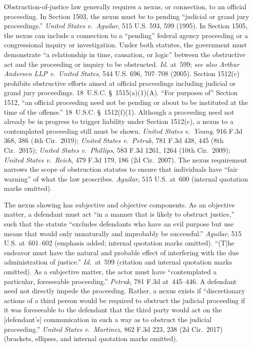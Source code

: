 Obstruction-of-justice law generally requires a nexus, or connection, to an official proceeding.
In Section 1503, the nexus must be to pending ``judicial or grand jury proceedings.''
\textit{United States v.\ Aguilar}, 515 U.S. 593, 599 (1995).
In Section 1505, the nexus can include a connection to a ``pending'' federal agency proceeding or a congressional inquiry or investigation.
Under both statutes, the government must demonstrate ``a relationship in time, causation, or logic'' between the obstructive act and the proceeding or inquiry to be obstructed.
\textit{Id.} at~599; \textit{see also Arthur Andersen LLP v.\ United States}, 544 U.S. 696, 707--708 (2005).
Section 1512(c) prohibits obstructive efforts aimed at official proceedings including judicial or grand jury proceedings.
18~U.S.C. \S~1515(a)(1)(A).
``For purposes of'' Section 1512, ``an official proceeding need not be pending or about to be instituted at the time of the offense.''
18~U.S.C. \S~1512(f)(1).
Although a proceeding need not already be in progress to trigger liability under Section 1512(c), a nexus to a contemplated proceeding still must be shown.
\textit{United States v.\ Young}, 916 F.3d 368, 386 (4th Cir.~2019);
\textit{United States v.\ Petruk}, 781 F.3d 438, 445 (8th Cir.~2015);
\textit{United States v.\ Phillips}, 583 F.3d 1261, 1264 (10th Cir.~2009);
\textit{United States v.\ Reich}, 479 F.3d 179, 186 (2d Cir.~2007).
The nexus requirement narrows the scope of obstruction statutes to ensure that individuals have ``fair warning'' of what the law proscribes.
\textit{Aguilar}, 515 U.S. at~600 (internal quotation marks omitted).

The nexus showing has subjective and objective components.
As an objective matter, a defendant must act ``in a manner that is likely to obstruct justice,'' such that the statute ``excludes defendants who have an evil purpose but use means that would only unnaturally and improbably be successful.''
\textit{Aguilar}, 515 U.S. at~601--602 (emphasis added; internal quotation marks omitted).
``(T]he endeavor must have the natural and probable effect of interfering with the due administration of justice.''
\textit{Id.}~at~599 (citation and internal quotation marks omitted).
As a subjective matter, the actor must have ``contemplated a particular, foreseeable proceeding.''
\textit{Petruk}, 781 F.3d at~445--446.
A defendant need not directly impede the proceeding.
Rather, a nexus exists if ``discretionary actions of a third person would be required to obstruct the judicial proceeding if it was foreseeable to the defendant that the third party would act on the [defendant's] communication in such a way as to obstruct the judicial proceeding.''
\textit{United States v.\ Martinez}, 862 F.3d 223, 238 (2d Cir.~2017) (brackets, ellipses, and internal quotation marks omitted).

